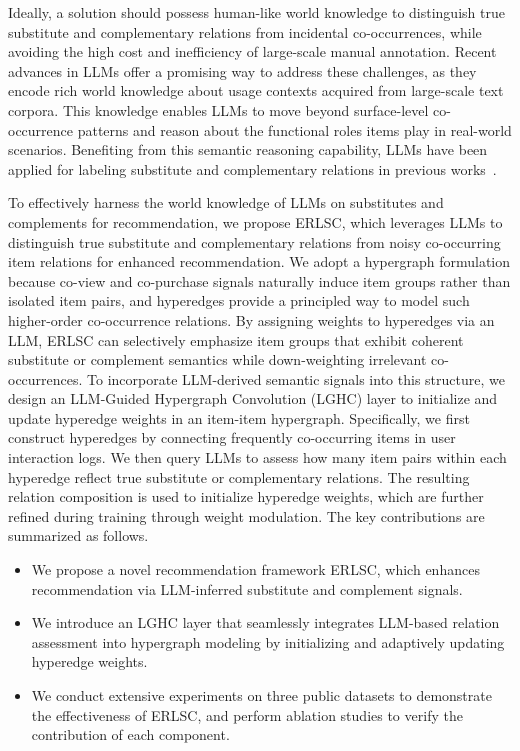 Ideally, a solution should possess human-like world knowledge to distinguish true substitute and complementary relations from incidental co-occurrences, while avoiding the high cost and inefficiency of large-scale manual annotation. Recent advances in LLMs offer a promising way to address these challenges, as they encode rich world knowledge about usage contexts acquired from large-scale text corpora. This knowledge enables LLMs to move beyond surface-level co-occurrence patterns and reason about the functional roles items play in real-world scenarios. 
Benefiting from this semantic reasoning capability, LLMs have been applied for labeling substitute and complementary relations in previous works~\cite{llmlabel23papso, llmlabel25Hosseini}.

To effectively harness the world knowledge of LLMs on substitutes and complements for recommendation, we propose ERLSC, which leverages LLMs to distinguish true substitute and complementary relations from noisy co-occurring item relations for enhanced recommendation. We adopt a hypergraph formulation because co-view and co-purchase signals naturally induce item groups rather than isolated item pairs, and hyperedges provide a principled way to model such higher-order co-occurrence relations. By assigning weights to hyperedges via an LLM, ERLSC can selectively emphasize item groups that exhibit coherent substitute or complement semantics while down-weighting irrelevant co-occurrences.
To incorporate LLM-derived semantic signals into this structure, we design an LLM-Guided Hypergraph Convolution (LGHC) layer to initialize and update hyperedge weights in an item-item hypergraph. Specifically, we first construct hyperedges by connecting frequently co-occurring items in user interaction logs. We then query LLMs to assess how many item pairs within each hyperedge reflect true substitute or complementary relations. The resulting relation composition is used to initialize hyperedge weights, which are further refined during training through weight modulation.
The key contributions are summarized as follows.
\begin{itemize}[left=0pt]
    \item We propose a novel recommendation framework ERLSC, which enhances recommendation via LLM-inferred substitute and complement signals.
    \item We introduce an LGHC layer that seamlessly integrates LLM-based relation assessment into hypergraph modeling by initializing and adaptively updating hyperedge weights.
    \item We conduct extensive experiments on three public datasets to demonstrate the effectiveness of ERLSC, and perform ablation studies to verify the contribution of each component.
\end{itemize}

